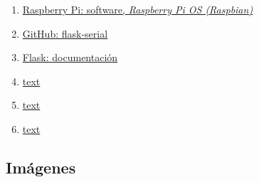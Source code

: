 \documentclass[12pt]{article}
\begin{document}
\begin{enumerate}
						
			\item 
			\label{bib: raspbian}
			\href{https://www.raspberrypi.org/software/}{Raspberry Pi: software, \textit{Raspberry Pi OS (Raspbian)}}
			
						
			\item 
			\label{bib: flask serial}
			\href{https://github.com/RedFalsh/flask-serial/blob/master/README.md}{GitHub: flask-serial}
		
						
			\item 
			\label{bib: flask doc}
			\href{https://flask.palletsprojects.com/en/2.0.x/}{Flask: documentación}
			
			
			\item 
			\label{bib: link12}
			\href{URL}{text}
			
			
			\item 
			\label{bib: link12}
			\href{URL}{text}
			
			
			\item 
			\label{bib: link12}
			\href{URL}{text}
			
			
		\end{enumerate}
		
		\subsection*{Imágenes}
		
\end{document}
